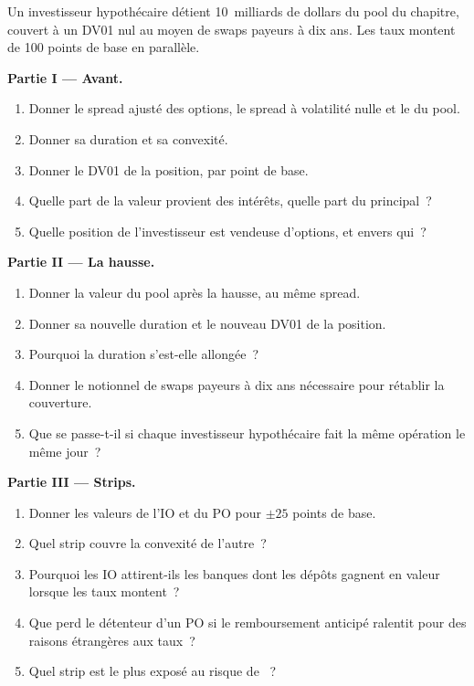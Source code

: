 \begin{problem}\label{pb:rc:mortgage-modelling:1}
Un investisseur hypothécaire détient 10~milliards de dollars du pool du chapitre, couvert à un DV01 nul
au moyen de swaps payeurs à dix ans. Les taux montent de 100 points de base en parallèle.

\medskip\noindent\textbf{Partie I --- Avant.}
\begin{enumerate}
\item Donner le spread ajusté des options, le spread à volatilité nulle et le  du pool.
\item Donner sa duration et sa convexité.
\item Donner le DV01 de la position, par point de base.
\item Quelle part de la valeur provient des intérêts, quelle part du principal~?
\item Quelle position de l'investisseur est vendeuse d'options, et envers qui~?
\end{enumerate}

\medskip\noindent\textbf{Partie II --- La hausse.}
\begin{enumerate}[resume]
\item Donner la valeur du pool après la hausse, au même spread.
\item Donner sa nouvelle duration et le nouveau DV01 de la position.
\item Pourquoi la duration s'est-elle allongée~?
\item Donner le notionnel de swaps payeurs à dix ans nécessaire pour rétablir la couverture.
\item Que se passe-t-il si chaque investisseur hypothécaire fait la même opération le même jour~?
\end{enumerate}

\medskip\noindent\textbf{Partie III --- Strips.}
\begin{enumerate}[resume]
\item Donner les valeurs de l'IO et du PO pour $\pm25$ points de base.
\item Quel strip couvre la convexité de l'autre~?
\item Pourquoi les IO attirent-ils les banques dont les dépôts gagnent en valeur lorsque les taux montent~?
\item Que perd le détenteur d'un PO si le remboursement anticipé ralentit pour des raisons étrangères aux taux~?
\item Quel strip est le plus exposé au risque de ~?
\end{enumerate}


\end{problem}
